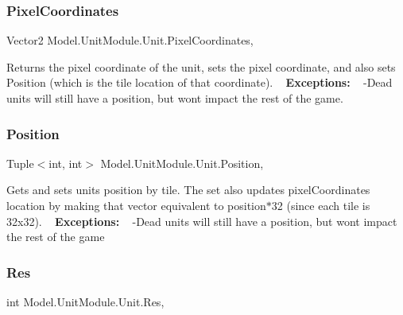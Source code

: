 \subsubsection{\texorpdfstring{Pixel\+Coordinates}{PixelCoordinates}}
{\footnotesize\ttfamily Vector2 Model.\+Unit\+Module.\+Unit.\+Pixel\+Coordinates\hspace{0.3cm}{\ttfamily [get]}, {\ttfamily [set]}}

Returns the pixel coordinate of the unit, sets the pixel coordinate, and also sets Position (which is the tile location of that coordinate). ~\newline
{\bfseries Exceptions\+:} ~\newline
 -\/\+Dead units will still have a position, but won\textquotesingle{}t impact the rest of the game. \hypertarget{interface_model_1_1_unit_module_1_1_unit_ad27310abf1f0ffb35774c6a4ec4a923b}{}\label{interface_model_1_1_unit_module_1_1_unit_ad27310abf1f0ffb35774c6a4ec4a923b} 
\subsubsection{\texorpdfstring{Position}{Position}}
{\footnotesize\ttfamily Tuple$<$int, int$>$ Model.\+Unit\+Module.\+Unit.\+Position\hspace{0.3cm}{\ttfamily [get]}, {\ttfamily [set]}}

Gets and sets unit\textquotesingle{}s position by tile. The set also updates pixel\+Coordinate\textquotesingle{}s location by making that vector equivalent to position$\ast$32 (since each tile is 32x32). ~\newline
 {\bfseries Exceptions\+:} ~\newline
 -\/\+Dead units will still have a position, but won\textquotesingle{}t impact the rest of the game \hypertarget{interface_model_1_1_unit_module_1_1_unit_a2502fd4f033d014dbe3c15f884730d70}{}\label{interface_model_1_1_unit_module_1_1_unit_a2502fd4f033d014dbe3c15f884730d70} 
\subsubsection{\texorpdfstring{Res}{Res}}
{\footnotesize\ttfamily int Model.\+Unit\+Module.\+Unit.\+Res\hspace{0.3cm}{\ttfamily [get]}, {\ttfamily [set]}}


